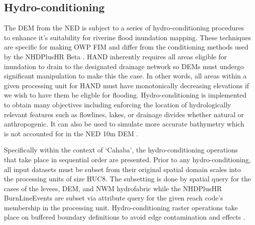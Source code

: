 \subsection{Hydro-conditioning}
\label{ssec:hydro_conditioning}
%
The DEM from the NED is subject to a series of hydro-conditioning procedures to enhance it's suitability for riverine flood inundation mapping. 
These techniques are specific for making OWP FIM and differ from the conditioning methods used by the NHDPlusHR Beta \cite{moore2019user}.
HAND inherently requires all areas eligible for inundation to drain to the designated drainage network so DEMs must undergo significant manipulation to make this the case.
In other words, all areas within a given processing unit for HAND must have monotonically decreasing elevations if we wish to have them be eligble for flooding.
Hydro-conditioning is implemented to obtain many objectives including enforcing the location of hydrologically relevant features such as flowlines, lakes, or drainage divides whether natural or anthropogenic. 
It can also be used to simulate more accurate bathymetry which is not accounted for in the NED 10m DEM \cite{gesch2002national}.

Specifically within the context of `Cahaba', the hydro-conditioning operations that take place in sequential order are presented. 
Prior to any hydro-conditioning, all input datasets must be subset from their original spatial domain scales into the processing units of size HUC8. 
The subsetting is done by spatial query for the cases of the levees, DEM, and NWM hydrofabric while the NHDPlusHR BurnLineEvents are subset via attribute query for the given reach code's membership in the processing unit.
Hydro-conditioning raster operations take place on buffered boundary definitions to avoid edge contamination and effects \cite{lindsay2013measuring}. 
%
